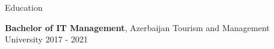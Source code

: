 \documentclass{resume} %
\begin{document}


\begin{rSection}{Education}
    
    {\bf Bachelor of IT Management}, Azerbaijan Tourism and Management University \hfill {2017 - 2021}


\end{rSection}



\end{document}
